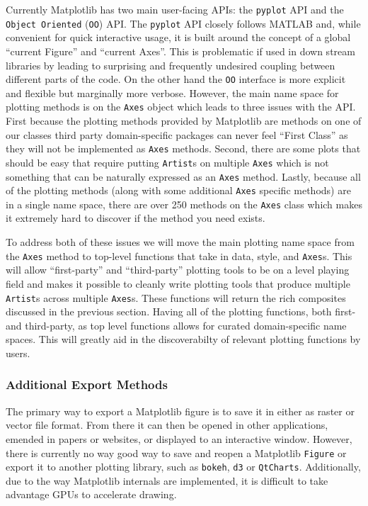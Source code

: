 \documentclass[11pt]{article}  %
\begin{document}
Currently Matplotlib has two main user-facing APIs: the
\texttt{pyplot} API and the \texttt{Object Oriented} (\texttt{OO})
API.  The \texttt{pyplot} API closely follows MATLAB and, while
convenient for quick interactive usage, it is built around the concept
of a global ``current Figure'' and ``current Axes''.  This is
problematic if used in down stream libraries by leading to surprising
and frequently undesired coupling between different parts of the code.
On the other hand the \texttt{OO} interface is more explicit and
flexible but marginally more verbose.  However, the main name space
for plotting methods is on the \texttt{Axes} object which leads to
three issues with the API.  First because the plotting methods
provided by Matplotlib are methods on one of our classes third party
domain-specific packages can never feel ``First Class'' as they will
not be implemented as \texttt{Axes} methods.  Second, there are some
plots that should be easy that require putting \texttt{Artist}s on
multiple \texttt{Axes} which is not something that can be naturally
expressed as an \texttt{Axes} method.  Lastly, because all of the
plotting methods (along with some additional \texttt{Axes} specific
methods) are in a single name space, there are over 250 methods on the
\texttt{Axes} class which makes it extremely hard to discover if the
method you need exists.

To address both of these issues we will move the main plotting name
space from the \texttt{Axes} method to top-level functions that take in
data, style, and \texttt{Axes}s.  This will allow ``first-party'' and
``third-party'' plotting tools to be on a level playing field and
makes it possible to cleanly write plotting tools that produce
multiple \texttt{Artist}s across multiple \texttt{Axes}s.  These
functions will return the rich composites discussed in the previous
section.  Having all of the plotting functions, both first- and
third-party, as top level functions allows for curated domain-specific
name spaces.  This will greatly aid in the discoverabilty of relevant
plotting functions by users.



\subsubsection{Additional Export Methods}

The primary way to export a Matplotlib figure is to save it in either
as raster or vector file format.  From there it can then be opened in
other applications, emended in papers or websites, or displayed to an
interactive window.  However, there is currently no way good way to
save and reopen a Matplotlib \texttt{Figure} or export it to another
plotting library, such as \texttt{bokeh}, \texttt{d3} or
\texttt{QtCharts}.  Additionally, due to the way Matplotlib internals
are implemented, it is difficult to take advantage GPUs to accelerate
drawing.
\end{document}
